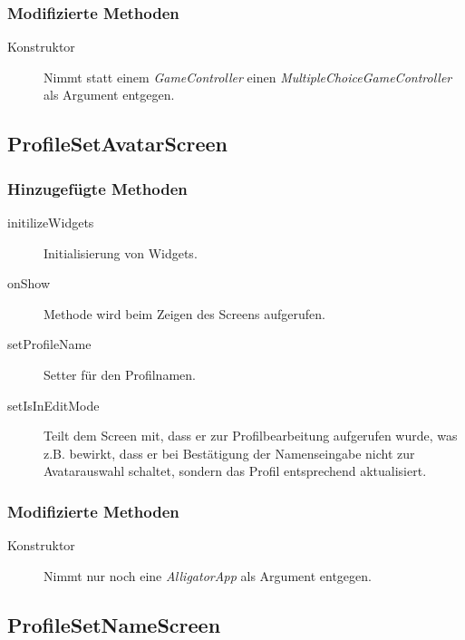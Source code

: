 \subsubsection{Modifizierte Methoden}
\begin{description}
\item[Konstruktor]
Nimmt statt einem \emph{GameController} einen \emph{MultipleChoiceGameController} als Argument entgegen.

\end{description}



\subsection{ProfileSetAvatarScreen}

\subsubsection{Hinzugefügte Methoden}
\begin{description}
\item[initilizeWidgets]
Initialisierung von Widgets.
\item[onShow]
Methode wird beim Zeigen des Screens aufgerufen.
\item[setProfileName]
Setter für den Profilnamen.
\item[setIsInEditMode]
Teilt dem Screen mit, dass er zur Profilbearbeitung aufgerufen wurde, was z.B. bewirkt, dass er bei Bestätigung der Namenseingabe nicht zur Avatarauswahl schaltet, sondern das Profil entsprechend aktualisiert.
\end{description}

\subsubsection{Modifizierte Methoden}
\begin{description}
\item[Konstruktor]
Nimmt nur noch eine \emph{AlligatorApp} als Argument entgegen.

\end{description}



\subsection{ProfileSetNameScreen}

